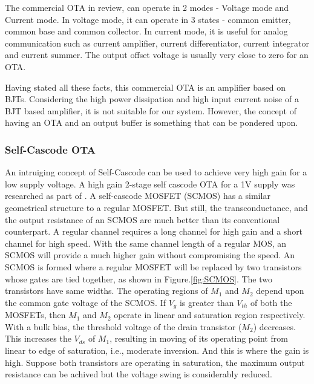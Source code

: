 The commercial OTA in review, can operate in 2 modes - Voltage mode and Current mode. In voltage mode, it can operate in 3 states - common emitter, common base and common collector. In current mode, it is useful for analog communication such as current amplifier, current differentiator, current integrator and current summer. The output offset voltage is usually very close to zero for an OTA.

Having stated all these facts, this commercial OTA is an amplifier based on BJTs. Considering the high power dissipation and high input current noise of a BJT based amplifier, it is not suitable for our system. However, the concept of having an OTA and an output buffer \cite{lt1228} is something that can be pondered upon.

\subsubsection{Self-Cascode OTA}
An intruiging concept of Self-Cascode can be used to achieve very high gain for a low supply voltage. A high gain 2-stage self cascode OTA for a 1V supply was researched as part of \cite{scmos_ota}. A self-cascode MOSFET (SCMOS) has a similar geometrical structure to a regular MOSFET. But still, the transconductance, and the output resistance of an SCMOS are much better than its conventional counterpart. A regular channel requires a long channel for high gain and a short channel for high speed. With the same channel length of a regular MOS, an SCMOS will provide a much higher gain without compromising the speed. 
An SCMOS is formed where a regular MOSFET will be replaced by two transistors whose gates are tied together, as shown in Figure.\ref{fig:SCMOS}. The two transistors have same widths. The operating regions of $M_1$ and $M_2$ depend upon the common gate voltage of the SCMOS. If $V_g$ is greater than $V_{th}$ of both the MOSFETs, then $M_1$ and $M_2$ operate in linear and saturation region respectively. With a bulk bias, the threshold voltage of the drain transistor ($M_2$) decreases. This increases the $V_{ds}$ of $M_1$, resulting in moving of its operating point from linear to edge of saturation, i.e., moderate inversion. And this is where the gain is high. Suppose both transistors are operating in saturation, the maximum output resistance can be achived but the voltage swing is considerably reduced.

